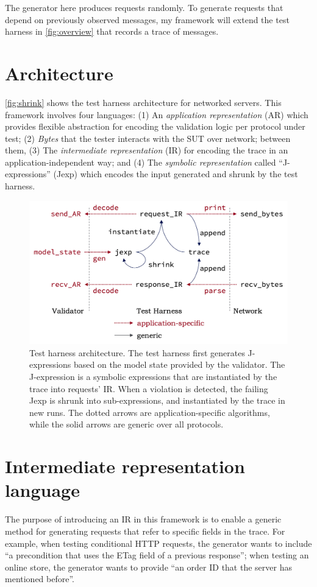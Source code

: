 The  generator here produces requests randomly.  To
generate requests that depend on previously observed messages, my framework will
extend the test harness in \autoref{fig:overview} that records a trace of
messages.

\section{Architecture}
\autoref{fig:shrink} shows the test harness architecture for networked
servers.  This framework involves four languages: (1) An {\em
  application representation} (AR) which provides flexible abstraction
for encoding the validation logic per protocol under test; (2) {\em
  Bytes} that the tester interacts with the SUT over network; between
them, (3) The {\em intermediate representation} (IR) for encoding the
trace in an application-independent way; and (4) The {\em symbolic
  representation} called ``J-expressions'' (Jexp) which encodes the
input generated and shrunk by the test harness.

\begin{figure}
  \includegraphics[width=.8\textwidth]{figures/shrink}
  \caption{Test harness architecture.  The test harness first generates
    J-expressions based on the model state provided by the validator.  The
    J-expression is a symbolic expressions that are instantiated by the trace
    into requests' IR.  When a violation is detected, the failing Jexp is shrunk
    into sub-expressions, and instantiated by the trace in new runs.  The dotted
    arrows are application-specific algorithms, while the solid arrows are
    generic over all protocols.}
  \label{fig:shrink}
\end{figure}

\section{Intermediate representation language}
The purpose of introducing an IR in this framework is to enable a generic method
for generating requests that refer to specific fields in the trace.  For
example, when testing conditional HTTP requests, the generator wants to include
``a precondition that uses the ETag field of a previous response''; when testing
an online store, the generator wants to provide ``an order ID that the server
has mentioned before''.

